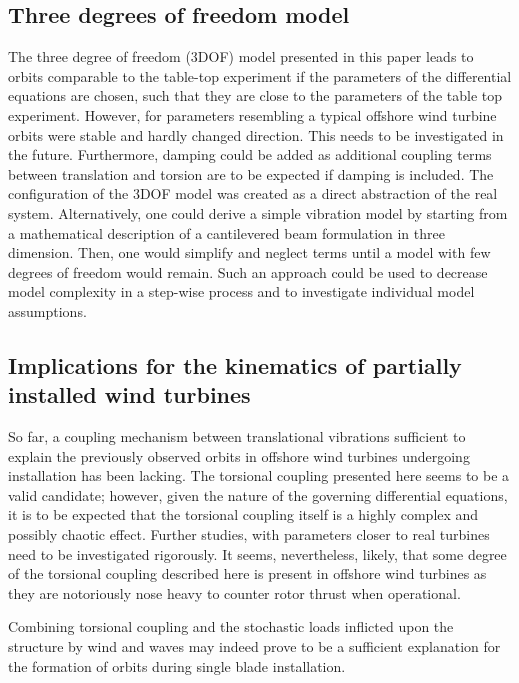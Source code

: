 \documentclass{article}
\begin{document}
\subsection{Three degrees of freedom model}

The three degree of freedom (3DOF) model presented in this paper leads to orbits comparable to the table-top experiment if the parameters of the differential equations are chosen, such that they are close to the parameters of the table top experiment. However, for parameters resembling a typical offshore wind turbine orbits were stable and  hardly changed direction. This needs to be investigated in the future. Furthermore, damping could be added as additional coupling terms between translation and torsion are to be expected if damping is included. The configuration of the 3DOF model was created as a direct abstraction of the real system. Alternatively, one could derive a simple vibration model by starting from a mathematical description of a cantilevered beam formulation in three dimension. Then, one would simplify and neglect terms until a model with few degrees of freedom would remain. Such an approach could be used to decrease model complexity in a step-wise process and to investigate individual model assumptions.

\subsection{Implications for the kinematics of partially installed wind turbines}

So far, a coupling mechanism between translational vibrations sufficient to explain the previously observed orbits in offshore wind turbines undergoing installation has been lacking. The torsional coupling presented here seems to be a valid candidate; however, given the nature of the governing differential equations, it is to be expected that the torsional coupling itself is a highly complex and possibly chaotic effect. Further studies, with parameters closer to real turbines need to be investigated rigorously. It seems, nevertheless, likely, that some degree of the torsional coupling described here is present in offshore wind turbines as they are notoriously nose heavy to counter rotor thrust when operational. 

Combining torsional coupling and the stochastic loads inflicted upon the structure by wind and waves may indeed prove to be a sufficient explanation for the formation of orbits during single blade installation.

\clearpage


\end{document}
